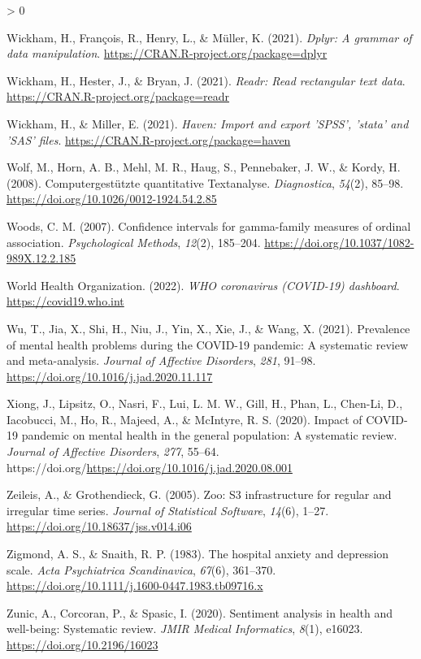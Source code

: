 \documentclass[
  english,
  jou,floatsintext]{apa7}
\newlength{\cslhangindent}
\newenvironment{CSLReferences}[2] %
 {%
  \setlength{\parindent}{0pt}
  \ifodd #1 \everypar{\setlength{\hangindent}{\cslhangindent}}\ignorespaces\fi
  \ifnum #2 > 0
  \setlength{\parskip}{#2\baselineskip}
  \fi
 }%
 {}
\begin{document}
\begin{CSLReferences}{1}{0}
\leavevmode\hypertarget{ref-R-dplyr}{}%
Wickham, H., François, R., Henry, L., \& Müller, K. (2021). \emph{Dplyr: A grammar of data manipulation}. \url{https://CRAN.R-project.org/package=dplyr}

\leavevmode\hypertarget{ref-R-readr}{}%
Wickham, H., Hester, J., \& Bryan, J. (2021). \emph{Readr: Read rectangular text data}. \url{https://CRAN.R-project.org/package=readr}

\leavevmode\hypertarget{ref-R-haven}{}%
Wickham, H., \& Miller, E. (2021). \emph{Haven: Import and export 'SPSS', 'stata' and 'SAS' files}. \url{https://CRAN.R-project.org/package=haven}

\leavevmode\hypertarget{ref-Wolf_2008}{}%
Wolf, M., Horn, A. B., Mehl, M. R., Haug, S., Pennebaker, J. W., \& Kordy, H. (2008). Computergestützte quantitative {Textanalyse}. \emph{Diagnostica}, \emph{54}(2), 85--98. \url{https://doi.org/10.1026/0012-1924.54.2.85}

\leavevmode\hypertarget{ref-Woods2007}{}%
Woods, C. M. (2007). Confidence intervals for gamma-family measures of ordinal association. \emph{Psychological Methods}, \emph{12}(2), 185--204. \url{https://doi.org/10.1037/1082-989X.12.2.185}

\leavevmode\hypertarget{ref-WHO2022}{}%
World Health Organization. (2022). \emph{WHO coronavirus (COVID-19) dashboard}. \url{https://covid19.who.int}

\leavevmode\hypertarget{ref-WU202191}{}%
Wu, T., Jia, X., Shi, H., Niu, J., Yin, X., Xie, J., \& Wang, X. (2021). Prevalence of mental health problems during the COVID-19 pandemic: A systematic review and meta-analysis. \emph{Journal of Affective Disorders}, \emph{281}, 91--98. \url{https://doi.org/10.1016/j.jad.2020.11.117}

\leavevmode\hypertarget{ref-Xiong2020}{}%
Xiong, J., Lipsitz, O., Nasri, F., Lui, L. M. W., Gill, H., Phan, L., Chen-Li, D., Iacobucci, M., Ho, R., Majeed, A., \& McIntyre, R. S. (2020). Impact of COVID-19 pandemic on mental health in the general population: A systematic review. \emph{Journal of Affective Disorders}, \emph{277}, 55--64. https://doi.org/\url{https://doi.org/10.1016/j.jad.2020.08.001}

\leavevmode\hypertarget{ref-R-zoo}{}%
Zeileis, A., \& Grothendieck, G. (2005). Zoo: S3 infrastructure for regular and irregular time series. \emph{Journal of Statistical Software}, \emph{14}(6), 1--27. \url{https://doi.org/10.18637/jss.v014.i06}

\leavevmode\hypertarget{ref-Zigmond1983}{}%
Zigmond, A. S., \& Snaith, R. P. (1983). The hospital anxiety and depression scale. \emph{Acta Psychiatrica Scandinavica}, \emph{67}(6), 361--370. \url{https://doi.org/10.1111/j.1600-0447.1983.tb09716.x}

\leavevmode\hypertarget{ref-zunic2020sentiment}{}%
Zunic, A., Corcoran, P., \& Spasic, I. (2020). Sentiment analysis in health and well-being: Systematic review. \emph{JMIR Medical Informatics}, \emph{8}(1), e16023. \url{https://doi.org/10.2196/16023}

\end{CSLReferences}
\end{document}
